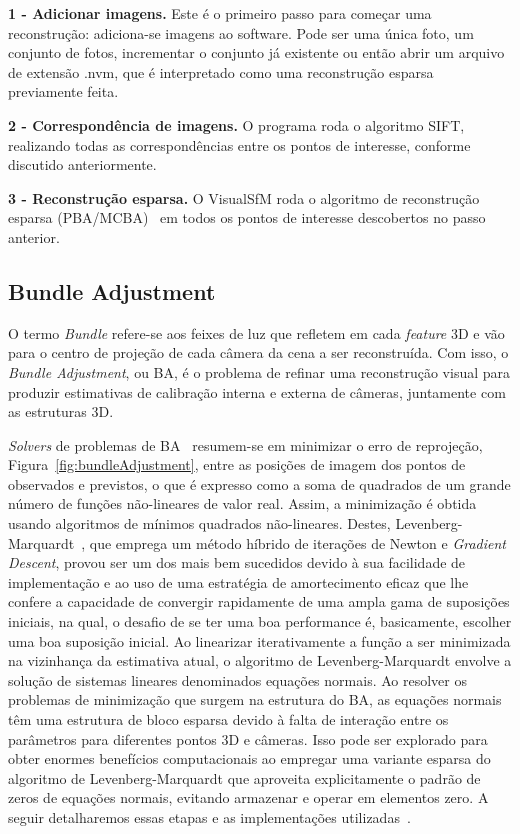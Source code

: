 \noindent \textbf{1 - Adicionar imagens.} Este é o primeiro passo para
  começar uma reconstrução: adiciona-se imagens ao software. Pode ser
  uma única foto, um conjunto de fotos, incrementar o conjunto já existente ou
  então abrir um arquivo de extensão .nvm, que é interpretado como uma
  reconstrução esparsa previamente feita.

\noindent \textbf{2 - Correspondência de imagens.} O programa roda o
  algoritmo SIFT, realizando todas as correspondências entre os pontos de
  interesse, conforme discutido anteriormente.

\noindent \textbf{3 - Reconstrução esparsa.} O VisualSfM roda o
  algoritmo de reconstrução esparsa (PBA/MCBA)~\cite{wu2011multicore} em todos
  os pontos de interesse descobertos no passo anterior. 


\subsection*{Bundle Adjustment}

O termo \emph{Bundle} refere-se aos feixes de luz que refletem em cada
\emph{feature} 3D e vão para o centro de projeção de cada câmera da cena a ser reconstruída.
Com isso, o \emph{Bundle Adjustment}, ou BA, é o problema de refinar uma reconstrução
visual para produzir estimativas de calibração interna e externa de câmeras, juntamente com as estruturas 3D.

\emph{Solvers} de problemas de BA~\cite{bundleAdjustmentSlide} resumem-se em
minimizar o erro de reprojeção, Figura~\ref{fig:bundleAdjustment}, entre as posições de
imagem dos pontos de observados e previstos, o que é expresso como a soma
de quadrados de um grande número de funções não-lineares de valor real. Assim, a
minimização é obtida usando algoritmos de mínimos quadrados não-lineares.
Destes, Levenberg-Marquardt~\cite{more1978levenberg,press1992art}, que emprega
um método híbrido de iterações de Newton e \emph{Gradient Descent}, provou ser um
dos mais bem sucedidos devido à sua facilidade de implementação e ao uso de uma
estratégia de amortecimento eficaz que lhe confere a capacidade de convergir
rapidamente de uma ampla gama de suposições iniciais, na qual, o desafio de se
ter uma boa performance é, basicamente, escolher uma boa suposição inicial. Ao
linearizar iterativamente a função a ser minimizada na vizinhança da estimativa
atual, o algoritmo de Levenberg-Marquardt envolve a solução de sistemas lineares
denominados equações normais. Ao resolver os problemas de minimização que surgem
na estrutura do BA, as equações normais têm uma estrutura
de bloco esparsa devido à falta de interação entre os parâmetros para diferentes
pontos 3D e câmeras. Isso pode ser explorado para obter enormes benefícios
computacionais ao empregar uma variante esparsa do algoritmo de
Levenberg-Marquardt que aproveita explicitamente o padrão de zeros de equações
normais, evitando armazenar e operar em elementos zero.  A seguir detalharemos
essas etapas e as implementações utilizadas~\cite{fabbri2011multiview}.

